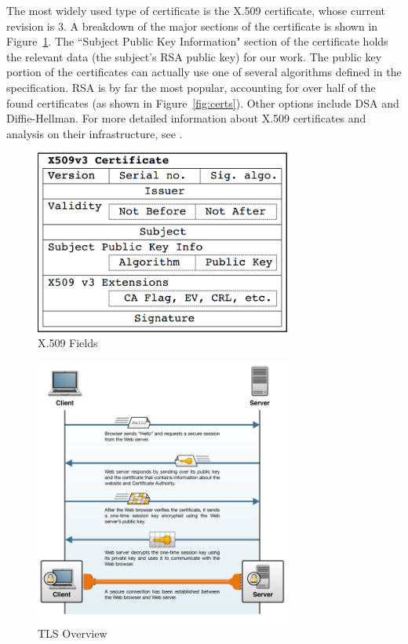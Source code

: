 \documentclass[smallextended]{svjour3}       %
\begin{document}
The most widely used type of certificate is the X.509 certificate, whose current
revision is 3. A breakdown of the major sections of the certificate is shown in
Figure~\ref{fig:x509}. The ``Subject Public Key Information" section of the
certificate holds the relevant data (the subject's RSA public key) for our work.
The public key portion of the certificates can actually use one of several
algorithms defined in the specification. RSA is by far the most popular,
accounting for over half of the found certificates (as shown in
Figure~\ref{fig:certs}). Other options include DSA and Diffie-Hellman. For more
detailed information about X.509 certificates and analysis on their
infrastructure, see \citet{holz2011ssl}.

\begin{figure}
   \centering
   \includegraphics[width=0.75\textwidth]{x509}
   \caption{X.509 Fields \citep{holz2011ssl}\label{fig:x509}}
\end{figure}

\begin{figure}
   \centering
   \includegraphics[width=0.75\textwidth]{tls}
   \caption{TLS Overview \citep{tlsconcepts}\label{fig:tls}}
\end{figure}
\end{document}
